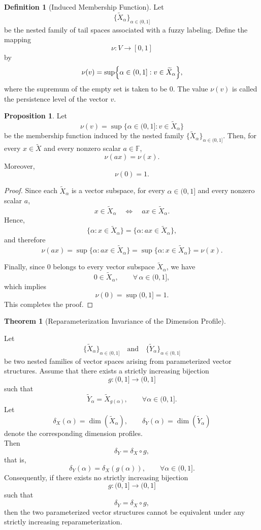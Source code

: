 \documentclass[preprint,12pt]{elsarticle}
\theoremstyle{definition}
\newtheorem{definition}{Definition}[section]
\newtheorem{theorem}{Theorem}[section]
\newtheorem{proposition}{Proposition}[section]
\begin{document}
\begin{definition}[Induced Membership Function]\label{def:induced-membership}
	Let
	\[
	\{\widetilde{X}_{\alpha}\}_{\alpha\in(0,1]}
	\]
	be the nested family of tail spaces associated with a fuzzy labeling.
	Define the mapping
	\[
	\nu:V\longrightarrow [0,1]
	\]
	by
	\[
	\nu(v)=
	\sup\Bigl\{
	\alpha\in(0,1]:
	v\in\widetilde{X}_{\alpha}
	\Bigr\},
	\]
	where the supremum of the empty set is taken to be \(0\).
	The value \(\nu(v)\) is called the persistence level of the vector \(v\).
\end{definition}
\begin{proposition}\label{prop:scalar-invariance-membership}
	Let
	\[
	\nu(v)=\sup\{\alpha\in(0,1]:v\in\widetilde{X}_{\alpha}\}
	\]
	be the membership function induced by the nested family
	$\{\widetilde{X}_{\alpha}\}_{\alpha\in(0,1]}$.
	Then, for every $x\in\widetilde{X}$ and every nonzero scalar
	$a\in\mathbb{F}$,
	\[
	\nu(ax)=\nu(x).
	\]
	Moreover,
	\[
	\nu(0)=1.
	\]
\end{proposition}

\begin{proof}
	Since each $\widetilde{X}_{\alpha}$ is a vector subspace, for every
	$\alpha\in(0,1]$ and every nonzero scalar $a$,
	\[
	x\in\widetilde{X}_{\alpha}
	\quad\Longleftrightarrow\quad
	ax\in\widetilde{X}_{\alpha}.
	\]
	Hence,
	\[
	\{\alpha:x\in\widetilde{X}_{\alpha}\}
	=
	\{\alpha:ax\in\widetilde{X}_{\alpha}\},
	\]
	and therefore
	\[
	\nu(ax)
	=
	\sup\{\alpha:ax\in\widetilde{X}_{\alpha}\}
	=
	\sup\{\alpha:x\in\widetilde{X}_{\alpha}\}
	=
	\nu(x).
	\]
	
	Finally, since $0$ belongs to every vector subspace
	$\widetilde{X}_{\alpha}$, we have
	\[
	0\in\widetilde{X}_{\alpha},
	\qquad \forall\,\alpha\in(0,1],
	\]
	which implies
	\[
	\nu(0)
	=
	\sup(0,1]
	=
	1.
	\]
	This completes the proof.
\end{proof}
\begin{theorem}[Reparameterization Invariance of the Dimension Profile]
	\label{thm:DimensionProfileInvariant}
	
	Let
	\[
	\{\widetilde X_\alpha\}_{\alpha\in(0,1]}
	\quad\text{and}\quad
	\{\widetilde Y_\alpha\}_{\alpha\in(0,1]}
	\]
	be two nested families of vector spaces arising from parameterized vector
	structures.
	Assume that there exists a strictly increasing bijection
	\[
	g:(0,1]\longrightarrow(0,1]
	\]
	such that
	\[
	\widetilde Y_\alpha
	=
	\widetilde X_{g(\alpha)},
	\qquad
	\forall\alpha\in(0,1].
	\]Let
	\[
	\delta_X(\alpha)=\dim(\widetilde X_\alpha),
	\qquad
	\delta_Y(\alpha)=\dim(\widetilde Y_\alpha)
	\]
	denote the corresponding dimension profiles.\\Then
	\[
	\delta_Y
	=
	\delta_X\circ g,
	\]
	that is,
	\[
	\delta_Y(\alpha)
	=
	\delta_X(g(\alpha)),
	\qquad
	\forall\alpha\in(0,1].
	\]Consequently, if there exists no strictly increasing bijection
	\[
	g:(0,1]\longrightarrow(0,1]
	\]
	such that
	\[
	\delta_Y=\delta_X\circ g,
	\]
	then the two parameterized vector structures cannot be equivalent under any
	strictly increasing reparameterization.
	
\end{theorem}
\end{document}
